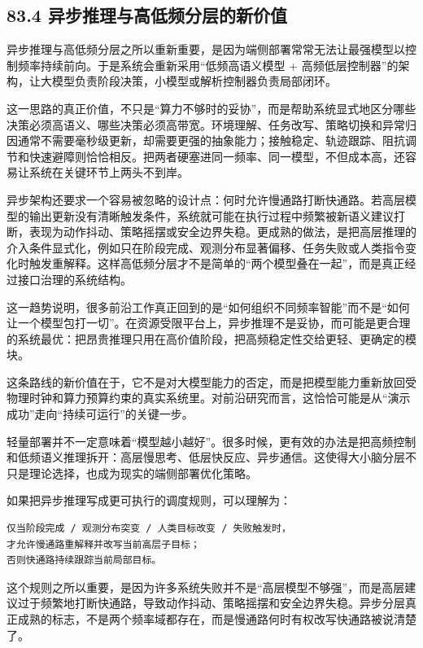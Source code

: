 \subsection*{83.4 异步推理与高低频分层的新价值}


异步推理与高低频分层之所以重新重要，是因为端侧部署常常无法让最强模型以控制频率持续前向。于是系统会重新采用“低频高语义模型 + 高频低层控制器”的架构，让大模型负责阶段决策，小模型或解析控制器负责局部闭环。

这一思路的真正价值，不只是“算力不够时的妥协”，而是帮助系统显式地区分哪些决策必须高语义、哪些决策必须高带宽。环境理解、任务改写、策略切换和异常归因通常不需要毫秒级更新，却需要更强的抽象能力；接触稳定、轨迹跟踪、阻抗调节和快速避障则恰恰相反。把两者硬塞进同一频率、同一模型，不但成本高，还容易让系统在关键环节上两头不到岸。

异步架构还要求一个容易被忽略的设计点：何时允许慢通路打断快通路。若高层模型的输出更新没有清晰触发条件，系统就可能在执行过程中频繁被新语义建议打断，表现为动作抖动、策略摇摆或安全边界失稳。更成熟的做法，是把高层推理的介入条件显式化，例如只在阶段完成、观测分布显著偏移、任务失败或人类指令变化时触发重解释。这样高低频分层才不是简单的“两个模型叠在一起”，而是真正经过接口治理的系统结构。

这一趋势说明，很多前沿工作真正回到的是“如何组织不同频率智能”而不是“如何让一个模型包打一切”。在资源受限平台上，异步推理不是妥协，而可能是更合理的系统最优：把昂贵推理只用在高价值阶段，把高频稳定性交给更轻、更确定的模块。

这条路线的新价值在于，它不是对大模型能力的否定，而是把模型能力重新放回受物理时钟和算力预算约束的真实系统里。对前沿研究而言，这恰恰可能是从“演示成功”走向“持续可运行”的关键一步。

轻量部署并不一定意味着“模型越小越好”。很多时候，更有效的办法是把高频控制和低频语义推理拆开：高层慢思考、低层快反应、异步通信。这使得大小脑分层不只是理论选择，也成为现实的端侧部署优化策略。

如果把异步推理写成更可执行的调度规则，可以理解为：

\begin{lstlisting}
仅当阶段完成 / 观测分布突变 / 人类目标改变 / 失败触发时，
才允许慢通路重解释并改写当前高层子目标；
否则快通路持续跟踪当前局部目标。
\end{lstlisting}

这个规则之所以重要，是因为许多系统失败并不是“高层模型不够强”，而是高层建议过于频繁地打断快通路，导致动作抖动、策略摇摆和安全边界失稳。异步分层真正成熟的标志，不是两个频率域都存在，而是慢通路何时有权改写快通路被说清楚了。

